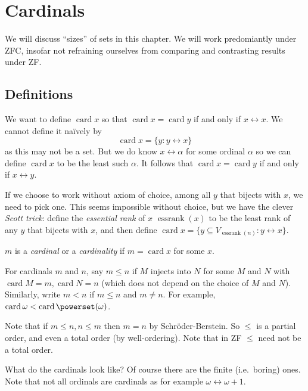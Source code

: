 \documentclass[a4paper]{article}
\DeclareMathOperator{\card}{card}
\newcommand*{\biject}{\leftrightarrow}
\begin{document}
\section{Cardinals}

We will discuss ``sizes'' of sets in this chapter. We will work predomiantly under ZFC, insofar not refraining ourselves from comparing and contrasting results under ZF.

\subsection{Definitions}

We want to define \(\card x\) so that \(\card x = \card y\) if and only if \(x \biject x\). We cannot define it naïvely by
\[
  \card x = \{y: y \biject x\}
\]
as this may not be a set. But we do know \(x \biject \alpha\) for some ordinal \(\alpha\) so we can define \(\card x\) to be the least such \(\alpha\). It follows that \(\card x = \card y\) if and only if \(x \biject y\).

If we choose to work without axiom of choice, among all \(y\) that bijects with \(x\), we need to pick one. This seems impossible without choice, but we have the clever \emph{Scott trick}: define the \emph{essential rank} of \(x\) \(\operatorname{essrank}(x)\) to be the least rank of any \(y\) that bijects with \(x\), and then define \(\card x = \{y \subseteq V_{\operatorname{essrank}(n)}: y \biject x\}\).

\begin{definition}[Cardinal]
  \(m\) is a \emph{cardinal} or a \emph{cardinality} if \(m = \card x\) for some \(x\).
\end{definition}

For cardinals \(m\) and \(n\), say \(m \leq n\) if \(M\) injects into \(N\) for some \(M\) and \(N\) with \(\card M = m, \card N = n\) (which does not depend on the choice of \(M\) and \(N\)). Similarly, write \(m < n\) if \(m \leq n\) and \(m \neq n\). For example, \(\card \omega < \card \powerset(\omega)\).

Note that if \(m \leq n, n \leq m\) then \(m = n\) by Schröder-Berstein. So \(\leq\) is a partial order, and even a total order (by well-ordering). Note that in ZF \(\leq\) need not be a total order.

What do the cardinals look like? Of course there are the finite (i.e.\ boring) ones. Note that not all ordinals are cardinals as for example \(\omega \biject \omega + 1\).
\end{document}
